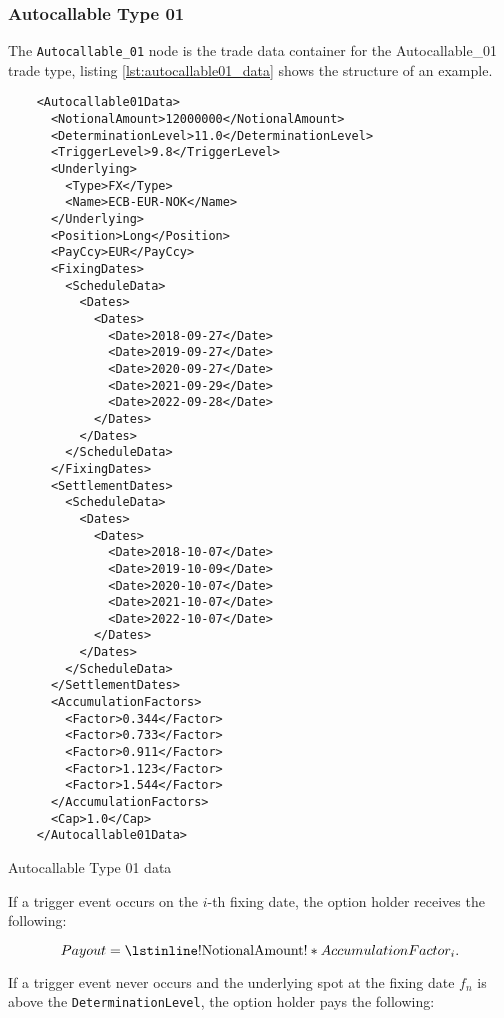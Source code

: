 \subsubsection{Autocallable Type 01}

The \verb+Autocallable_01+ node is the trade data container for the Autocallable\_01 trade type, listing
\ref{lst:autocallable01_data} shows the structure of an example.

\begin{listing}[H]
\begin{verbatim}
    <Autocallable01Data>
      <NotionalAmount>12000000</NotionalAmount>
      <DeterminationLevel>11.0</DeterminationLevel>
      <TriggerLevel>9.8</TriggerLevel>
      <Underlying>
        <Type>FX</Type>
        <Name>ECB-EUR-NOK</Name>
      </Underlying>
      <Position>Long</Position>
      <PayCcy>EUR</PayCcy>
      <FixingDates>
        <ScheduleData>
          <Dates>
            <Dates>
              <Date>2018-09-27</Date>
              <Date>2019-09-27</Date>
              <Date>2020-09-27</Date>
              <Date>2021-09-29</Date>
              <Date>2022-09-28</Date>
            </Dates>
          </Dates>
        </ScheduleData>
      </FixingDates>
      <SettlementDates>
        <ScheduleData>
          <Dates>
            <Dates>
              <Date>2018-10-07</Date>
              <Date>2019-10-09</Date>
              <Date>2020-10-07</Date>
              <Date>2021-10-07</Date>
              <Date>2022-10-07</Date>
            </Dates>
          </Dates>
        </ScheduleData>
      </SettlementDates>
      <AccumulationFactors>
        <Factor>0.344</Factor>
        <Factor>0.733</Factor>
        <Factor>0.911</Factor>
        <Factor>1.123</Factor>
        <Factor>1.544</Factor>
      </AccumulationFactors>
      <Cap>1.0</Cap>
    </Autocallable01Data>
\end{verbatim}
\caption{Autocallable Type 01 data}
\label{lst:autocallable01_data}
\end{listing}

If a trigger event occurs on the $i$-th fixing date, the option holder receives the following:

\begin{equation*}
  Payout = \text{\lstinline!NotionalAmount!} * AccumulationFactor_i.
\end{equation*}

If a trigger event never occurs and the underlying spot at the fixing date $f_n$ is above the \lstinline!DeterminationLevel!,
the option holder pays the following:

